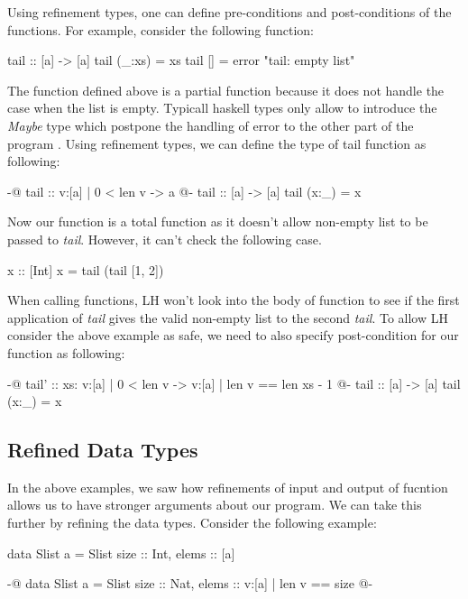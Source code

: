 \documentclass[]{rptuseminar}
\begin{document}
Using refinement types, one can define pre-conditions and post-conditions of the functions\cite{jhala_programming_2020}. 
For example, consider the following function:

\begin{haskell}
 tail :: [a] -> [a]
 tail (_:xs) = xs
 tail [] = error "tail: empty list"
\end{haskell}

The function defined above is a partial function because it does not handle the case when the list is empty. 
Typicall haskell types only allow to introduce the \textit{Maybe} type which postpone the handling of error to the other 
part of the program \cite{jhala_programming_2020}. Using refinement types, we can define the type of tail function as following:

\begin{haskell}
 {-@ tail :: {v:[a] | 0 < len v} -> a @-}
 tail :: [a] -> [a]
 tail (x:_) = x
\end{haskell}

Now our function is a total function as it doesn't allow non-empty list to be passed to \textit{tail}. However, it can't 
check the following case.

\begin{haskell}
 x :: [Int]
 x = tail (tail [1, 2])
\end{haskell}

When calling functions, LH won't look into the body of function to see if the first application of \textit{tail} gives the valid non-empty list to the second \textit{tail}.
To allow LH consider the above example as safe, we need to also specify post-condition for our function as following:

\begin{haskell}
 {-@ tail' :: xs: {v:[a] | 0 < len v} -> {v:[a] | len v == len xs - 1} @-}
 tail :: [a] -> [a]
 tail (x:_) = x
\end{haskell}
\subsection{Refined Data Types}
In the above examples, we saw how refinements of input and output of fucntion allows us to have stronger arguments about our program. 
We can take this further by refining the data types. Consider the following example:

\begin{haskell}
  data Slist a = Slist { size :: Int, elems :: [a] }

  {-@ data Slist a = Slist { size :: Nat, elems :: {v:[a] | len v == size} } @-}
\end{haskell}
\end{document}
